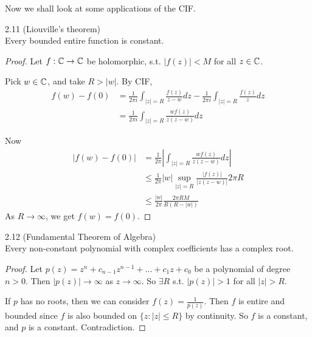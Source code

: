 \documentclass[a4paper]{article}
\begin{document}
Now we shall look at some applications of the CIF.

\begin{thm} 2.11 (Liouville's theorem)\\
Every bounded entire function is constant.
\begin{proof}
Let $f:\mathbb{C} \to \mathbb{C}$ be holomorphic, s.t. $|f(z)|<M$ for all $z \in \mathbb{C}$.

Pick $w \in \mathbb{C}$, and take $R > |w|$. By CIF,
\begin{equation*}
\begin{aligned}
f(w)-f(0) &= \frac{1}{2\pi i}\int_{|z|=R} \frac{f(z)}{z-w}dz - \frac{1}{2\pi i} \int_{|z|=R}\frac{f(z)}{z} dz\\
&= \frac{1}{2\pi i} \int_{|z|=R} \frac{wf(z)}{z(z-w)}dz
\end{aligned}
\end{equation*}

Now
\begin{equation*}
\begin{aligned}
|f(w)-f(0)| &= \frac{1}{2\pi} \left|\int_{|z|=R} \frac{wf(z)}{z(z-w)} dz\right|\\
&\leq \frac{1}{2\pi} |w| \sup_{|z|=R} \frac{|f(z)|}{|z(z-w)|}2\pi R\\
&\leq \frac{|w|}{2\pi}\frac{2\pi RM}{R(R-|w|)}
\end{aligned}
\end{equation*}
As $R \to \infty$, we get $f(w) = f(0)$.
\end{proof}
\end{thm}

\begin{thm} 2.12 (Fundamental Theorem of Algebra)\\
Every non-constant polynomial with complex coefficients has a complex root.
\begin{proof}
Let $p(z) =z^n + c_{n-1}z^{n-1}+...+c_1z+c_0$ be a polynomial of degree $n>0$. Then $|p(z)| \to \infty$ as $z \to \infty$. So $\exists R$ s.t. $|p(z)|>1$ for all $|z|>R$.

If $p$ has no roots, then we can consider $f(z) = \frac{1}{p(z)}$. Then $f$ is entire and bounded since $f$ is also bounded on $\{z:|z| \leq R\}$ by continuity. So $f$ is a constant, and $p$ is a constant. Contradiction.
\end{proof}
\end{thm}
\end{document}
